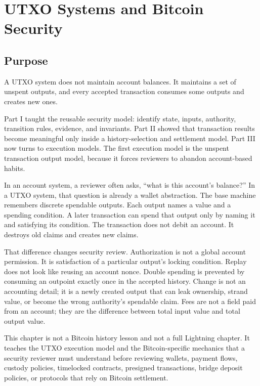 \chapter{UTXO Systems and Bitcoin Security}

\section{Purpose}

\begin{principlebox}
A UTXO system does not maintain account balances. It maintains a set of unspent outputs, and every accepted transaction consumes some outputs and creates new ones.
\end{principlebox}

Part I taught the reusable security model: identify state, inputs, authority, transition rules, evidence, and invariants. Part II showed that transaction results become meaningful only inside a history-selection and settlement model. Part III now turns to execution models. The first execution model is the unspent transaction output model, because it forces reviewers to abandon account-based habits.

In an account system, a reviewer often asks, ``what is this account's balance?'' In a UTXO system, that question is already a wallet abstraction. The base machine remembers discrete spendable outputs. Each output names a value and a spending condition. A later transaction can spend that output only by naming it and satisfying its condition. The transaction does not debit an account. It destroys old claims and creates new claims.

That difference changes security review. Authorization is not a global account permission. It is satisfaction of a particular output's locking condition. Replay does not look like reusing an account nonce. Double spending is prevented by consuming an outpoint exactly once in the accepted history. Change is not an accounting detail; it is a newly created output that can leak ownership, strand value, or become the wrong authority's spendable claim. Fees are not a field paid from an account; they are the difference between total input value and total output value.

This chapter is not a Bitcoin history lesson and not a full Lightning chapter. It teaches the UTXO execution model and the Bitcoin-specific mechanics that a security reviewer must understand before reviewing wallets, payment flows, custody policies, timelocked contracts, presigned transactions, bridge deposit policies, or protocols that rely on Bitcoin settlement.

